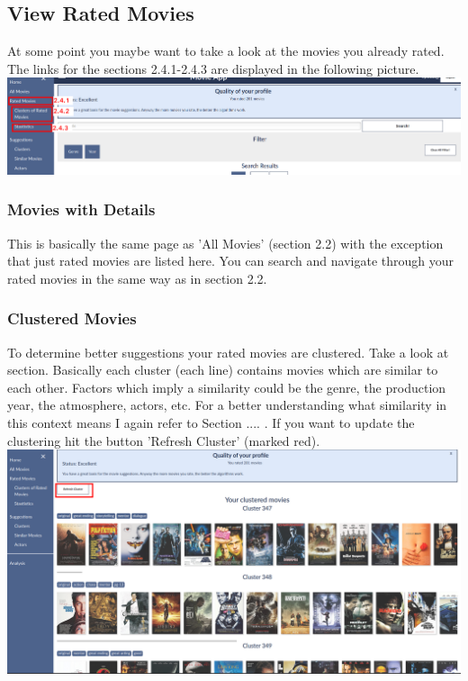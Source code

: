 \documentclass{article}
\begin{document}
\subsection{View Rated Movies}

At some point you maybe want to take a look at the movies you already rated. The links for the sections 2.4.1-2.4.3 are displayed in the following picture.
\\[2ex]
\includegraphics[scale=0.3]{screenshots_app/rated_movies_navigation.png}\\


\subsubsection{Movies with Details}

This is basically the same page as 'All Movies' (section 2.2) with the exception that just rated movies are listed here. You can search and navigate through your rated movies in the same way as in section 2.2.

\subsubsection{Clustered Movies}

To determine better suggestions your rated movies are clustered. Take a look at section. Basically each cluster (each line) contains movies which are similar to each other. Factors which imply a similarity could be the genre, the production year, the atmosphere, actors, etc. For a better understanding what similarity in this context means I again refer to Section .... .
If you want to update the clustering hit the button 'Refresh Cluster' (marked red).\\[2ex]
\includegraphics[scale=0.3]{screenshots_app/rated_movies_clustered.png}\\
\end{document}

